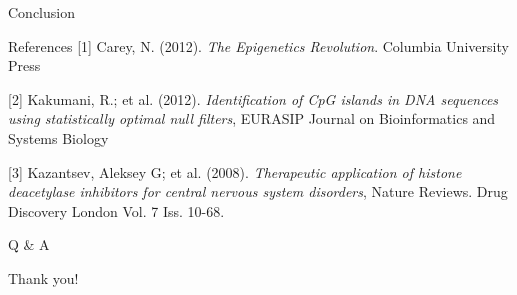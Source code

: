 \documentclass{beamer}
\begin{document}
    \begin{frame}{Conclusion}

    \end{frame}

    \begin{frame}{References}
        \footnotesize [1] Carey, N. (2012). \textit{The Epigenetics Revolution}. Columbia University Press
    
        \footnotesize [2] Kakumani, R.; et al. (2012). \textit{Identification of CpG islands in DNA sequences using statistically optimal null filters}, EURASIP Journal on Bioinformatics and Systems Biology 
    
        \footnotesize [3] Kazantsev, Aleksey G; et al. (2008). \textit{Therapeutic application of histone deacetylase inhibitors for central nervous system disorders}, Nature Reviews. Drug Discovery\; London Vol. 7 Iss. 10-68.
    \end{frame}

    \begin{frame}[plain]
        \centering
        \huge Q \& A
    \end{frame}

    \begin{frame}[plain]
        \centering
        \huge Thank you!
    \end{frame}
\end{document}
